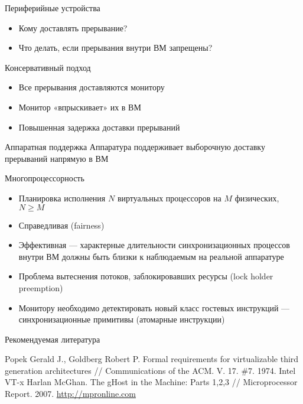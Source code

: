 \documentclass{beamer}
\begin{document}
\begin{frame}{Периферийные устройства}
\begin{itemize}
    \item Кому доставлять прерывание?
    \item Что делать, если прерывания внутри ВМ запрещены?
\end{itemize}
\end{frame}

\begin{frame}{Консервативный подход}
\begin{itemize}
    \item Все прерывания доставляются монитору
    \item Монитор «впрыскивает» их в ВМ
    \item Повышенная задержка доставки прерываний
\end{itemize}
\end{frame}

\begin{frame}{Аппаратная поддержка}
Аппаратура поддерживает выборочную доставку прерываний напрямую в ВМ

\end{frame}


\begin{frame}{Многопроцессорность}
\begin{itemize}
    \item Планировка исполнения $N$ виртуальных процессоров на $M$ физических, $N \geqslant M$
    \item Справедливая (fairness)
    \item Эффективная — характерные длительности синхронизационных процессов внутри ВМ должны быть близки к наблюдаемым на реальной аппаратуре
\end{itemize}

\begin{itemize}
    \item Проблема вытеснения потоков, заблокировавших ресурсы (lock holder preemption)
    \item Монитору необходимо детектировать новый класс гостевых инструкций — синхронизационные примитивы (атомарные инструкции)
\end{itemize}

\end{frame}



\begin{frame}[allowframebreaks]{Рекомендуемая литература}
\begin{thebibliography}{99}
 Popek Gerald J., Goldberg Robert P. Formal requirements for virtualizable third generation architectures // Communications of the ACM. V. 17. \#7. 1974.
 Intel VT-x
 Harlan McGhan. The gHost in the Machine: Parts 1,2,3 // Microprocessor Report. 2007. \url{http://mpronline.com}


\end{thebibliography}
\end{frame}
\end{document}
